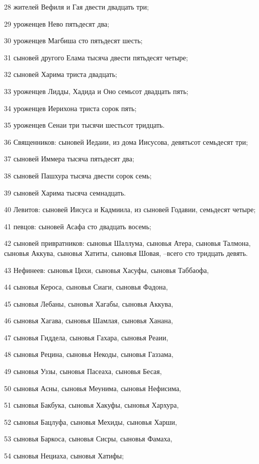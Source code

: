 \par 28 жителей Вефиля и Гая двести двадцать три;
\par 29 уроженцев Нево пятьдесят два;
\par 30 уроженцев Магбиша сто пятьдесят шесть;
\par 31 сыновей другого Елама тысяча двести пятьдесят четыре;
\par 32 сыновей Харима триста двадцать;
\par 33 уроженцев Лидды, Хадида и Оно семьсот двадцать пять;
\par 34 уроженцев Иерихона триста сорок пять;
\par 35 уроженцев Сенаи три тысячи шестьсот тридцать.
\par 36 Священников: сыновей Иедаии, из дома Иисусова, девятьсот семьдесят три;
\par 37 сыновей Иммера тысяча пятьдесят два;
\par 38 сыновей Пашхура тысяча двести сорок семь;
\par 39 сыновей Харима тысяча семнадцать.
\par 40 Левитов: сыновей Иисуса и Кадмиила, из сыновей Годавии, семьдесят четыре;
\par 41 певцов: сыновей Асафа сто двадцать восемь;
\par 42 сыновей привратников: сыновья Шаллума, сыновья Атера, сыновья Талмона, сыновья Аккува, сыновья Хатиты, сыновья Шовая, --всего сто тридцать девять.
\par 43 Нефинеев: сыновья Цихи, сыновья Хасуфы, сыновья Таббаофа,
\par 44 сыновья Кероса, сыновья Сиаги, сыновья Фадона,
\par 45 сыновья Лебаны, сыновья Хагабы, сыновья Аккува,
\par 46 сыновья Хагава, сыновья Шамлая, сыновья Ханана,
\par 47 сыновья Гиддела, сыновья Гахара, сыновья Реаии,
\par 48 сыновья Рецина, сыновья Некоды, сыновья Газзама,
\par 49 сыновья Уззы, сыновья Пасеаха, сыновья Бесая,
\par 50 сыновья Асны, сыновья Меунима, сыновья Нефисима,
\par 51 сыновья Бакбука, сыновья Хакуфы, сыновья Хархура,
\par 52 сыновья Бацлуфа, сыновья Мехиды, сыновья Харши,
\par 53 сыновья Баркоса, сыновья Сисры, сыновья Фамаха,
\par 54 сыновья Нециаха, сыновья Хатифы;
